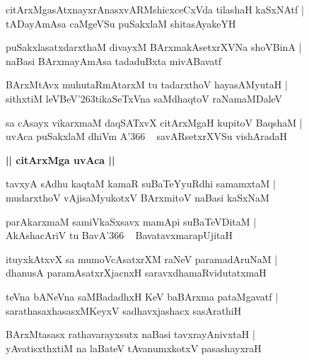 \documentclass[twoside,12pt,openright]{book}
\def\S{\char'263}
\newcounter{shloka}[chapter]
\def\uvaca#1{\centerline{{\large\textbf{#1}}}}
\begin{document}
\begin{shloka}%
citArxMgasAtxnayxrAnasxvARMshicxceCxVda tilashaH kaSxNAtf |\\
tADayAmAsa caMgeVSu puSakxlaM shitasAyakeYH
\end{shloka}

\begin{shloka}%
puSakxlasatxdarxthaM divayxM BArxmakAsetxrXVNa shoVBinA |\\
naBasi BArxmayAmAsa tadaduBxta mivABavatf 
\end{shloka}

\begin{shloka}%
BArxMtAvx muhutaRmAtarxM tu tadarxthoV hayasAMyutaH |\\
sithxtiM leVBeV\S tikaSeTxVna saMdhaqtoV raNamaMDaleV 
\end{shloka}

\begin{shloka}%
sa cAsayx vikarxmaM daqSATxvX citArxMgaH kupitoV BaqshaM |\\
uvAca puSakxlaM dhiVm A\char'366 ~ savARsetxrXVSu vishAradaH 
\end{shloka}

\uvaca{|| citArxMga uvAca ||}

\begin{shloka}%
tavxyA sAdhu kaqtaM kamaR suBaTeYyuRdhi samamxtaM |\\
mudarxthoV vAjisaMyukotxV BArxmitoV naBasi kaSxNaM 
\end{shloka}

\begin{shloka}%
parAkarxmaM samiVkaSxsavx mamApi suBaTeVDitaM |\\
AkAshacAriV tu BavA\char'366 ~ BavatavxmarapUjitaH 
\end{shloka}

\begin{shloka}%
ituyxkAtxvX sa mumoVcAsatxrXM raNeV paramadAruNaM |\\
dhanusA paramAsatxrXjacnxH saravxdhamaRvidutatxmaH 
\end{shloka}

\begin{shloka}%
teVna bANeVna saMBadadhxH KeV baBArxma pataMgavatf |\\
sarathasaxhasasxMKeyxV sadhavxjashacx sasArathiH
\end{shloka}

\begin{shloka}%
BArxMtasasx rathavarayxsutx naBasi tavxrayAnivxtaH |\\
yAvatisxthxtiM na laBateV tAvanumxkotxV pasashayxraH 
\end{shloka}
\end{document}
